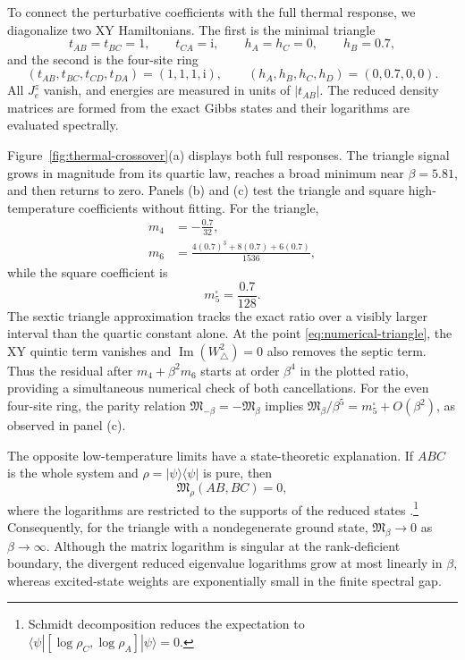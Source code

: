 \documentclass[aps,prb,preprint,nofootinbib,longbibliography]{revtex4-2}
\newcommand{\Mmod}{\mathfrak{M}}
\newcommand{\ii}{\mathrm{i}}
\begin{document}
To connect the perturbative coefficients with the full thermal response, we
diagonalize two XY Hamiltonians.  The first is the minimal
triangle
\begin{equation}
 t_{AB}=t_{BC}=1,\qquad t_{CA}=\ii,\qquad
 h_A=h_C=0,\qquad h_B=0.7,
 \label{eq:numerical-triangle}
\end{equation}
and the second is the four-site ring
\begin{equation}
 (t_{AB},t_{BC},t_{CD},t_{DA})=(1,1,1,\ii),\qquad
 (h_A,h_B,h_C,h_D)=(0,0.7,0,0).
 \label{eq:numerical-square}
\end{equation}
All $J_e^z$ vanish, and energies are measured in units of $|t_{AB}|$.  The
reduced density matrices are formed from the exact Gibbs states and their
logarithms are evaluated spectrally.

Figure~\ref{fig:thermal-crossover}(a) displays both full responses.  The
triangle signal grows in magnitude from its quartic law, reaches a broad
minimum near $\beta=5.81$, and then returns to zero.  Panels (b) and (c) test
the triangle and square high-temperature coefficients without fitting.  For
the triangle,
\begin{align}
 m_4&=-\frac{0.7}{32},\nonumber\\
 m_6&=\frac{4(0.7)^3+8(0.7)+6(0.7)}{1536},
 \label{eq:numerical-m4m6}
\end{align}
while the square coefficient is
\begin{equation}
 m_5^\square=\frac{0.7}{128}.
 \label{eq:numerical-square-m5}
\end{equation}
The sextic triangle approximation tracks the exact ratio over a visibly
larger interval than the quartic constant alone.  At the point
\eqref{eq:numerical-triangle}, the XY quintic term vanishes and
$\operatorname{Im}(W_\triangle^2)=0$ also removes the septic term.  Thus the
residual after $m_4+\beta^2m_6$ starts at order $\beta^4$ in the plotted
ratio, providing a simultaneous numerical check of both cancellations.  For
the even four-site ring, the parity relation
$\Mmod_{-\beta}=-\Mmod_\beta$ implies
$\Mmod_\beta/\beta^5=m_5^\square+O(\beta^2)$, as observed in panel (c).

The opposite low-temperature limits have a state-theoretic explanation.  If
$ABC$ is the whole system and $\rho=|\psi\rangle\langle\psi|$ is pure, then
\begin{equation}
 \Mmod_\rho(AB,BC)=0,
 \label{eq:pure-state-zero}
\end{equation}
where the logarithms are restricted to the supports of the reduced states
\cite{ZouEtAl2022}.\footnote{Schmidt decomposition reduces the expectation to
$\langle\psi|[\log\rho_C,\log\rho_A]|\psi\rangle=0$.}
Consequently, for the triangle with a nondegenerate
ground state, $\Mmod_\beta\to0$ as $\beta\to\infty$.  Although the matrix
logarithm is singular at the rank-deficient boundary, the divergent reduced
eigenvalue logarithms grow at most linearly in $\beta$, whereas excited-state
weights are exponentially small in the finite spectral gap.
\end{document}

